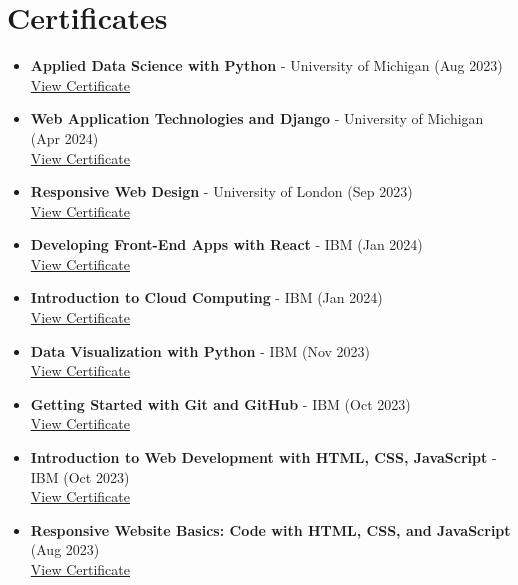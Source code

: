\documentclass[a4paper,11pt]{article}
\begin{document}
\vspace{10pt}

\section*{Certificates}

\begin{itemize}[leftmargin=*, itemsep=5pt]
  \item \textbf{Applied Data Science with Python} - University of Michigan (Aug 2023)\\
  \small\href{https://coursera.org/share/4a0b0b3c4e3d0b1e7d7d327915aaa16e}{View Certificate}
  
  \item \textbf{Web Application Technologies and Django} - University of Michigan (Apr 2024)\\
  \small\href{https://www.coursera.org/share/5ff8314779b840b495e3ee5fc726cfde}{View Certificate}
  
  \item \textbf{Responsive Web Design} - University of London (Sep 2023)\\
  \small\href{https://coursera.org/share/1bbdb06bcd04bc35434188707bb4de88}{View Certificate}
  
  \item \textbf{Developing Front-End Apps with React} - IBM (Jan 2024)\\
  \small\href{https://coursera.org/share/6dd8299a96f660ba21dea8f9f792b104}{View Certificate}
  
  \item \textbf{Introduction to Cloud Computing} - IBM (Jan 2024)\\
  \small\href{https://coursera.org/share/fc61595f8b14ca5c3aef8aaf8d180980}{View Certificate}
  
  \item \textbf{Data Visualization with Python} - IBM (Nov 2023)\\
  \small\href{https://coursera.org/share/d3b74757aaf297e046e4ee55fd60f45f}{View Certificate}
  
  \item \textbf{Getting Started with Git and GitHub} - IBM (Oct 2023)\\
  \small\href{https://coursera.org/share/9aba263325489f6cfac2634302877c48}{View Certificate}
  
  \item \textbf{Introduction to Web Development with HTML, CSS, JavaScript} - IBM (Oct 2023)\\
  \small\href{https://coursera.org/share/a1d2470d859117b111c8bbce8f4cee64}{View Certificate}
  
  \item \textbf{Responsive Website Basics: Code with HTML, CSS, and JavaScript} (Aug 2023)\\
  \small\href{https://coursera.org/share/936169505da3536b75b8bb343405d96e}{View Certificate}
\end{itemize}
\end{document}
